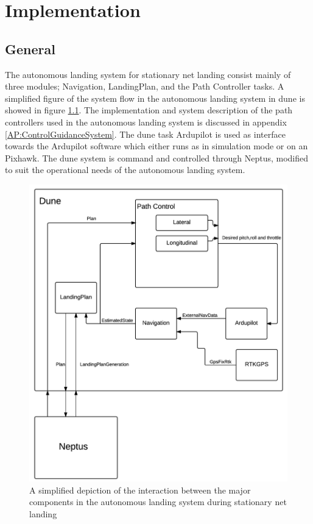 \chapter{Implementation}\label{Ch:Implementation}
\section{General}
The autonomous landing system for stationary net landing consist mainly of three modules; Navigation, LandingPlan, and the Path Controller tasks. A simplified figure of the system flow in the autonomous landing system in \gls{dune} is showed in figure \ref{fig:DuneSystem}. The implementation and system description of the path controllers used in the autonomous landing system is discussed in appendix \ref{AP:ControlGuidanceSystem}. The \gls{dune} task Ardupilot is used as interface towards the Ardupilot software which either runs as in simulation mode or on an Pixhawk. The \gls{dune} system is command  and controlled through Neptus, modified to suit the operational needs of the autonomous landing system.
\newpage
\begin{figure}[H]
	\centering
		\includegraphics[scale=0.8]{figs/DUNESystem.png}
		\caption{A simplified depiction of the interaction between the major components in the autonomous landing system during stationary net landing}
		\label{fig:DuneSystem}
\end{figure}
